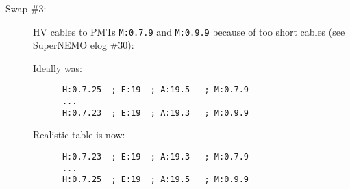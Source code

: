 \begin{itemize}
\begin{description}

    
  \item[Swap \#3:]  HV cables to PMTs \verb+M:0.7.9+ and \verb+M:0.9.9+ because of too short cables  (see SuperNEMO elog \#30):

    \par Ideally was:
    \begin{Verbatim}
      H:0.7.25  ; E:19  ; A:19.5   ; M:0.7.9 
      ...
      H:0.7.23  ; E:19  ; A:19.3   ; M:0.9.9   
    \end{Verbatim}                
    \par Realistic table is now:
    \begin{Verbatim}
      H:0.7.23  ; E:19  ; A:19.3   ; M:0.7.9   
      ...
      H:0.7.25  ; E:19  ; A:19.5   ; M:0.9.9   
    \end{Verbatim}                

  \end{description}

\end{itemize}


